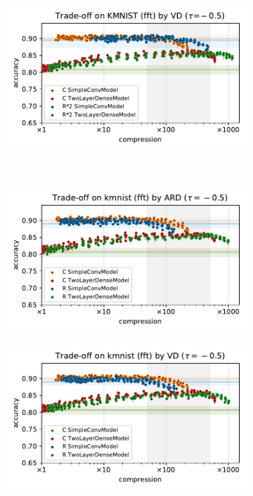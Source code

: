 \documentclass[a4paper,10pt,onecolumn]{article}
\begin{document}
\begin{figure}[b]
\begin{subfigure}[b]{0.5\columnwidth}
  \end{subfigure}%
  \begin{subfigure}[b]{0.5\columnwidth}
    \centering
    \includegraphics[width=\columnwidth]{figure__mnist-like__trade-off/appendix__cmp__VD__kmnist__fft__-0.5.pdf}
  \end{subfigure} \\ %
  \begin{subfigure}[b]{0.5\columnwidth}
    \centering
    \includegraphics[width=\columnwidth]{figure__mnist-like__trade-off/appendix__ARD__kmnist__fft__-0.5.pdf}
  \end{subfigure}%
  \begin{subfigure}[b]{0.5\columnwidth}
    \centering
    \includegraphics[width=\columnwidth]{figure__mnist-like__trade-off/appendix__VD__kmnist__fft__-0.5.pdf}

\end{subfigure}
\end{figure}
\end{document}
